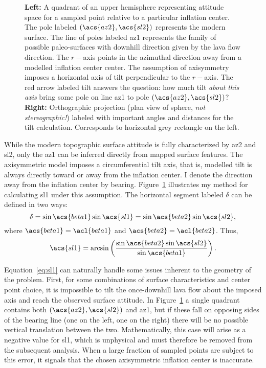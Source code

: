 \begin{figure}
\begin{center}
    \caption[\Acl{tilt} from mapping]{\textbf{Left:} A quadrant of an upper hemisphere representing attitude space for a sampled point relative to a particular inflation center. The pole labeled $\left(\acs{az2},\acs{sl2}\right)$ represents the modern surface. The line of poles labeled \acs{az1} represents the family of possible paleo-surfaces with downhill direction given by the lava flow direction. The $r-$axis points in the azimuthal direction away from a modelled inflation center \acs{center}. The assumption of axisymmetry imposes a horizontal axis of tilt perpendicular to the $r-$axis. The red arrow labeled \acs{tilt} answers the question: how much tilt \emph{about this axis} bring some pole on line \acs{az1} to pole $\left(\acs{az2},\acs{sl2}\right)$? \textbf{Right:} Orthographic projection (plan view of sphere, \emph{not stereographic!}) labeled with important angles and distances for the tilt calculation. Corresponds to horizontal grey rectangle on the left.}%
    \label{fig:tilt-from-map}%
\end{center}
\end{figure}
While the modern topographic surface attitude is fully characterized by \acs{az2} and \acs{sl2}, only the \acf{az1} can be inferred directly from mapped surface features. The axisymmetric model imposes a circumferential tilt axis, that is, modelled tilt is always directly toward or away from the inflation center. I denote the direction away from the inflation center by \acs{bearing}. Figure~\ref{fig:tilt-from-map} illustrates my method for calculating \acf{sl1} under this assumption. The horizontal segment labeled $\delta$ can be defined in two ways:
\begin{equation*}
    \delta = \sin\acs{beta1}\sin\acs{sl1} = \sin\acs{beta2}\sin\acs{sl2},
\end{equation*}
where $\acs{beta1} = \acl{beta1}$ and $\acs{beta2} = \acl{beta2}$. Thus,
\begin{equation}
    \acs{sl1} = \arcsin\left(\frac{\sin\acs{beta2}\sin\acs{sl2}}{\sin\acs{beta1}}\right).\label{eq:sl1}
\end{equation}

Equation~\eqref{eq:sl1} can naturally handle some issues inherent to the geometry of the problem. First, for some combinations of surface characteristics and center point choice, it is impossible to tilt the once-downhill lava flow about the imposed axis and reach the observed surface attitude. In Figure~\ref{fig:tilt-from-map} a single quadrant contains both $\left(\acs{az2},\acs{sl2}\right)$ and \acs{az1}, but if these fall on opposing sides of the \acs{bearing} line (one on the left, one on the right) there will be no possible vertical translation between the two. Mathematically, this case will arise as a negative value for \acs{sl1}, which is unphysical and must therefore be removed from the subsequent analysis. When a large fraction of sampled points are subject to this error, it signals that the chosen axisymmetric inflation center is inaccurate.

